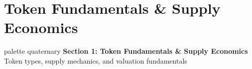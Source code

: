 \documentclass[8pt,aspectratio=169]{beamer}
\begin{document}
\section{Token Fundamentals \& Supply Economics}

\begin{frame}{}
\begin{beamercolorbox}[sep=12pt,center,rounded=true,shadow=true]{palette quaternary}
{\Large\bfseries Section 1: Token Fundamentals \& Supply Economics}\\[6pt]
{\normalsize Token types, supply mechanics, and valuation fundamentals}
\end{beamercolorbox}
\end{frame}
\end{document}
